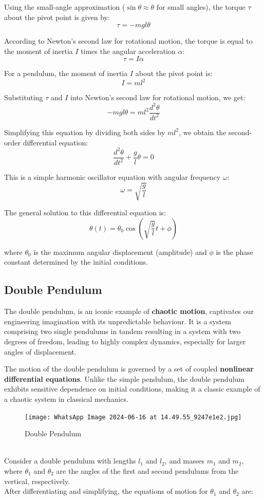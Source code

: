 \documentclass{article}
\begin{document}
Using the small-angle approximation (\(\sin \theta \approx \theta\) for small angles), the torque \( \tau \) about the pivot point is given by:
\[
\tau = -mgl\theta
\]

According to Newton’s second law for rotational motion, the torque is equal to the moment of inertia \( I \) times the angular acceleration \( \alpha \):
\[
\tau = I \alpha
\]

For a pendulum, the moment of inertia \( I \) about the pivot point is:
\[
I = ml^2
\]

Substituting \( \tau \) and \( I \) into Newton's second law for rotational motion, we get:
\[
-mgl\theta = ml^2 \frac{d^2 \theta}{dt^2}
\]

Simplifying this equation by dividing both sides by \( ml^2 \), we obtain the second-order differential equation:
\[
\frac{d^2 \theta}{dt^2} + \frac{g}{l} \theta = 0
\]

This is a simple harmonic oscillator equation with angular frequency \( \omega \):
\[
\omega = \sqrt{\frac{g}{l}}
\]

The general solution to this differential equation is:
\[
\theta(t) = \theta_0 \cos\left( \sqrt{\frac{g}{l}} t + \phi \right)
\]

where \( \theta_0 \) is the maximum angular displacement (amplitude) and \( \phi \) is the phase constant determined by the initial conditions.


\newpage
\subsection{Double Pendulum}

The double pendulum, is an iconic example of \textbf{chaotic motion}, captivates our engineering imagination with its unpredictable behaviour. It is a system comprising two single pendulums in tandem resulting in a system with two degrees of freedom, leading to highly complex dynamics, especially for larger angles of displacement. 

The motion of the double pendulum is governed by a set of coupled \textbf{nonlinear differential equations}. Unlike the simple pendulum, the double pendulum exhibits sensitive dependence on initial conditions, making it a classic example of a chaotic system in classical mechanics.
\\
\begin{figure}[h]
        \centering
        \texttt{[image: WhatsApp Image 2024-06-16 at 14.49.55\_9247e1e2.jpg]}
        \caption{Double Pendulum}
\end{figure}\\
Consider a double pendulum with lengths \( l_1 \) and \( l_2 \), and masses \( m_1 \) and \( m_2 \), where \( \theta_1 \) and \( \theta_2 \) are the angles of the first and second pendulums from the vertical, respectively. \\ 
After differentiating and simplifying, the equations of motion for \(\theta_1\) and \(\theta_2\) are:
\end{document}
